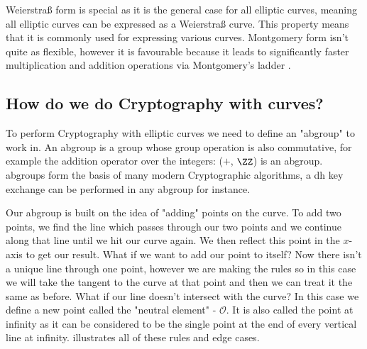 Weierstra\ss{} form is special as it is the general case for all elliptic curves, meaning all elliptic curves can be expressed as a Weierstra\ss{} curve.
This property means that it is commonly used for expressing various curves.
Montgomery form isn't quite as flexible, however it is favourable because it leads to significantly faster multiplication and addition operations via Montgomery's ladder \cite{montgom-ladder}.

\subsection{How do we do Cryptography with curves?}
To perform Cryptography with elliptic curves we need to define an "\gls{abgroup}" to work in.
An \gls{abgroup} is a group whose group operation is also commutative, for example the addition operator over the integers: ($+$, $\ZZ$) is an \gls{abgroup}.
\glspl{abgroup} form the basis of many modern Cryptographic algorithms, a \gls{dh} key exchange can be performed in any \gls{abgroup} for instance.

Our \gls{abgroup} is built on the idea of "adding" points on the curve.
To add two points, we find the line which passes through our two points and we continue along that line until we hit our curve again.
We then reflect this point in the $x$-axis to get our result.
What if we want to add our point to itself? Now there isn't a unique line through one point, however we are making the rules so in this case we will take the tangent to the curve at that point and then we can treat it the same as before.
What if our line doesn't intersect with the curve? In this case we define a new point called the "neutral element" - $\mathcal{O}$.
It is also called the point at infinity as it can be considered to be the single point at the end of every vertical line at infinity.
 illustrates all of these rules and edge cases.


